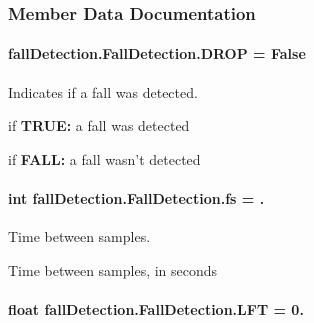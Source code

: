 \subsubsection{Member Data Documentation}
\hypertarget{classfall_detection_1_1_fall_detection_afa9560adcae4144df3ba9a753c920060}{
\paragraph[{D\-R\-O\-P}]{\setlength{\rightskip}{0pt plus 5cm}fall\-Detection.\-Fall\-Detection.\-D\-R\-O\-P = False\hspace{0.3cm}{\ttfamily [static]}}}\label{classfall_detection_1_1_fall_detection_afa9560adcae4144df3ba9a753c920060}


Indicates if a fall was detected. 


\begin{DoxyItemize}
\item if {\bfseries T\-R\-U\-E\-:} a fall was detected
\item if {\bfseries F\-A\-L\-L\-:} a fall wasn't detected 
\end{DoxyItemize}\hypertarget{classfall_detection_1_1_fall_detection_aedf3abe0136fa5efe23df8f35228d4a6}{
\paragraph[{fs}]{\setlength{\rightskip}{0pt plus 5cm}int fall\-Detection.\-Fall\-Detection.\-fs = .\hspace{0.3cm}{\ttfamily [static]}}}\label{classfall_detection_1_1_fall_detection_aedf3abe0136fa5efe23df8f35228d4a6}


Time between samples. 

Time between samples, in seconds \hypertarget{classfall_detection_1_1_fall_detection_a32fb8ad5bc5820480e2eb450c679eeda}{
\paragraph[{L\-F\-T}]{\setlength{\rightskip}{0pt plus 5cm}float fall\-Detection.\-Fall\-Detection.\-L\-F\-T = 0.\hspace{0.3cm}{\ttfamily [static]}}}\label{classfall_detection_1_1_fall_detection_a32fb8ad5bc5820480e2eb450c679eeda}


